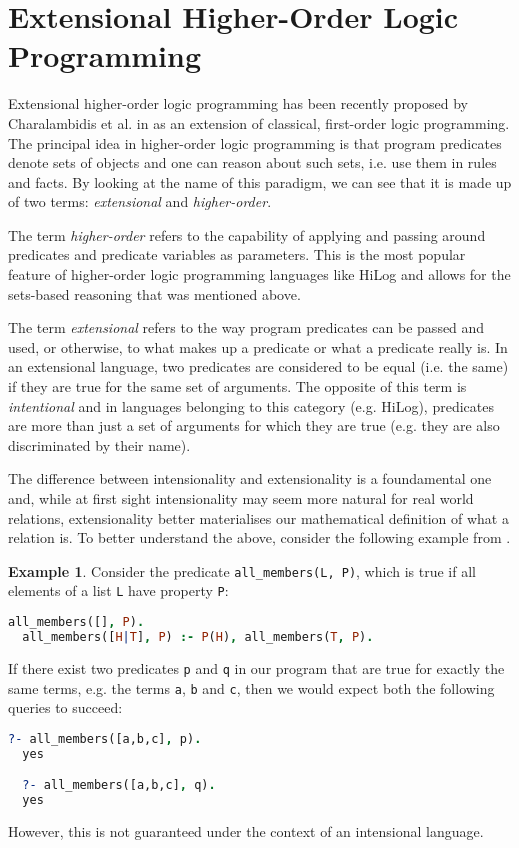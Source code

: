 \documentclass[inscr,ack,preface]{dithesis}
\theoremstyle{definition}
\newtheorem{example}{Example}[chapter]
\begin{document}
\section{Extensional Higher-Order Logic Programming}
Extensional higher-order logic programming has been recently proposed by Charalambidis et al. in \cite{DBLP:journals/tocl/CharalambidisHRW13} as an extension of classical, first-order logic programming. The principal idea in higher-order logic programming is that program predicates denote sets of objects and one can reason about such sets, i.e. use them in rules and facts. By looking at the name of this paradigm, we can see that it is made up of two terms: \emph{extensional} and \emph{higher-order}.

The term \emph{higher-order} refers to the capability of applying and passing around predicates and predicate variables as parameters. This is the most popular feature of higher-order logic programming languages like HiLog and allows for the sets-based reasoning that was mentioned above.

The term \emph{extensional} refers to the way program predicates can be passed and used, or otherwise, to what makes up a predicate or what a predicate really is. In an extensional language, two predicates are considered to be equal (i.e. the same) if they are true for the same set of arguments. The opposite of this term is \emph{intentional} and in languages belonging to this category (e.g. HiLog), predicates are more than just a set of arguments for which they are true (e.g. they are also discriminated by their name).

The difference between intensionality and extensionality is a foundamental one and, while at first sight intensionality may seem more natural for real world relations, extensionality better materialises our mathematical definition of what a relation is. To better understand the above, consider the following example from \cite{DBLP:journals/tocl/CharalambidisHRW13}.

\begin{example} Consider the predicate \texttt{all\_members(L, P)}, which is true if all elements of a list \texttt{L} have property \texttt{P}:
\begin{lstlisting}[language=Prolog,frame=single]
  all_members([], P).
  all_members([H|T], P) :- P(H), all_members(T, P).
\end{lstlisting}

If there exist two predicates \texttt{p} and \texttt{q} in our program that are true for exactly the same terms, e.g. the terms \texttt{a}, \texttt{b} and \texttt{c}, then we would expect both the following queries to succeed:
\begin{lstlisting}[language=Prolog,frame=single]
  ?- all_members([a,b,c], p).
  yes

  ?- all_members([a,b,c], q).
  yes
\end{lstlisting}
However, this is not guaranteed under the context of an intensional language.
\end{example}
\end{document}
